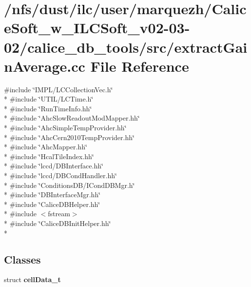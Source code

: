 \section{/nfs/dust/ilc/user/marquezh/\-Calice\-Soft\-\_\-w\-\_\-\-I\-L\-C\-Soft\-\_\-v02-\/03-\/02/calice\-\_\-db\-\_\-tools/src/extract\-Gain\-Average.cc File Reference}
\label{extractGainAverage_8cc}
{\ttfamily \#include \char`\"{}I\-M\-P\-L/\-L\-C\-Collection\-Vec.\-h\char`\"{}}\\*
{\ttfamily \#include \char`\"{}U\-T\-I\-L/\-L\-C\-Time.\-h\char`\"{}}\\*
{\ttfamily \#include \char`\"{}Run\-Time\-Info.\-hh\char`\"{}}\\*
{\ttfamily \#include \char`\"{}Ahc\-Slow\-Readout\-Mod\-Mapper.\-hh\char`\"{}}\\*
{\ttfamily \#include \char`\"{}Ahc\-Simple\-Temp\-Provider.\-hh\char`\"{}}\\*
{\ttfamily \#include \char`\"{}Ahc\-Cern2010\-Temp\-Provider.\-hh\char`\"{}}\\*
{\ttfamily \#include \char`\"{}Ahc\-Mapper.\-hh\char`\"{}}\\*
{\ttfamily \#include \char`\"{}Hcal\-Tile\-Index.\-hh\char`\"{}}\\*
{\ttfamily \#include \char`\"{}lccd/\-D\-B\-Interface.\-hh\char`\"{}}\\*
{\ttfamily \#include \char`\"{}lccd/\-D\-B\-Cond\-Handler.\-hh\char`\"{}}\\*
{\ttfamily \#include \char`\"{}Conditions\-D\-B/\-I\-Cond\-D\-B\-Mgr.\-h\char`\"{}}\\*
{\ttfamily \#include \char`\"{}D\-B\-Interface\-Mgr.\-hh\char`\"{}}\\*
{\ttfamily \#include \char`\"{}Calice\-D\-B\-Helper.\-hh\char`\"{}}\\*
{\ttfamily \#include $<$fstream$>$}\\*
{\ttfamily \#include \char`\"{}Calice\-D\-B\-Init\-Helper.\-hh\char`\"{}}\\*
\subsection*{Classes}
\begin{DoxyCompactItemize}
\item 
struct {\bf cell\-Data\-\_\-t}
\end{DoxyCompactItemize}
